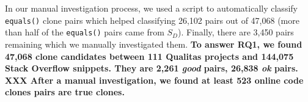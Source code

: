 \documentclass{sig-alternate-05-2015}
\begin{document}
In our manual investigation process, we used a script to automatically classify \texttt{equals()} clone pairs which helped classifying 26,102 pairs out of 47,068 (more than half of the \texttt{equals()} pairs came from $S_D$). Finally, there are 3,450 pairs remaining which we manually investigated them. \textbf{To answer RQ1, we found 47,068 clone candidates between 111 Qualitas projects and 144,075 Stack Overflow snippets. They are 2,261 \textit{good} pairs, 26,838 \textit{ok} pairs. XXX After a manual investigation, we found at least 523 online code clones pairs are true clones.}


\end{document}
